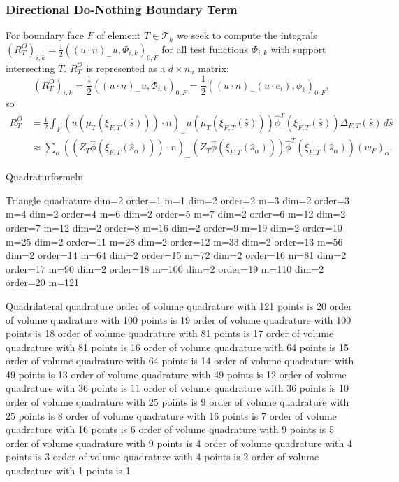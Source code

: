 \documentclass[a4paper,
		     12pt,
		     DIV10,
		     DIVcalc,
		     headings=normal,
		     oneside,
		     bibliography=totoc,
		     headsepline=false,
		     headinclude]{scrartcl}
\theoremstyle{definition}
\begin{document}
\subsubsection*{Directional Do-Nothing Boundary Term}

For boundary face $F$ of element $T\in\mathcal{T}_h$ we seek to compute the integrals 
$(R^{O}_T)_{i,k} = \frac12 ( (u\cdot n)_-u, \Phi_{i,k})_{0,F}$ for all test functions $\Phi_{i,k}$
with support intersecting $T$. $R^{O}_T$ is represented as a $d\times n_u$ matrix:
\begin{equation*}
(R^{O}_T)_{i,k} = \frac12 ( (u\cdot n)_-u  , \Phi_{i,k})_{0,F} = \frac12 ( (u\cdot n)_- (u\cdot e_i), \phi_{k} )_{0,F} ,
\end{equation*}
so
\begin{equation}
\begin{split}
R^{O}_T &= \frac12 \int_{\hat F} (u(\mu_T(\xi_{F,T}(\hat s)))\cdot n)_- u(\mu_T(\xi_{F,T}(\hat s)))  \hat\phi^T(\xi_{F,T}(\hat s)) \Delta_{F,T}(\hat s) \,d\hat s\\
&\approx \sum_\alpha ( (Z_T \hat\phi(\xi_{F,T}(\hat s_\alpha))) \cdot n)_- (Z_T \hat\phi(\xi_{F,T}(\hat s_\alpha))) \hat\phi^T(\xi_{F,T}(\hat s_\alpha))  (w_F)_\alpha .
\end{split}
\end{equation}


Quadraturformeln


Triangle quadrature
dim=2 order=1 m=1
dim=2 order=2 m=3
dim=2 order=3 m=4
dim=2 order=4 m=6
dim=2 order=5 m=7
dim=2 order=6 m=12
dim=2 order=7 m=12
dim=2 order=8 m=16
dim=2 order=9 m=19
dim=2 order=10 m=25
dim=2 order=11 m=28
dim=2 order=12 m=33
dim=2 order=13 m=56
dim=2 order=14 m=64
dim=2 order=15 m=72
dim=2 order=16 m=81
dim=2 order=17 m=90
dim=2 order=18 m=100
dim=2 order=19 m=110
dim=2 order=20 m=121

Quadrilateral quadrature
order of volume quadrature with 121 points is 20
order of volume quadrature with 100 points is 19
order of volume quadrature with 100 points is 18
order of volume quadrature with 81 points is 17
order of volume quadrature with 81 points is 16
order of volume quadrature with 64 points is 15
order of volume quadrature with 64 points is 14
order of volume quadrature with 49 points is 13
order of volume quadrature with 49 points is 12
order of volume quadrature with 36 points is 11
order of volume quadrature with 36 points is 10
order of volume quadrature with 25 points is 9
order of volume quadrature with 25 points is 8
order of volume quadrature with 16 points is 7
order of volume quadrature with 16 points is 6
order of volume quadrature with 9 points is 5
order of volume quadrature with 9 points is 4
order of volume quadrature with 4 points is 3
order of volume quadrature with 4 points is 2
order of volume quadrature with 1 points is 1




\end{document}
